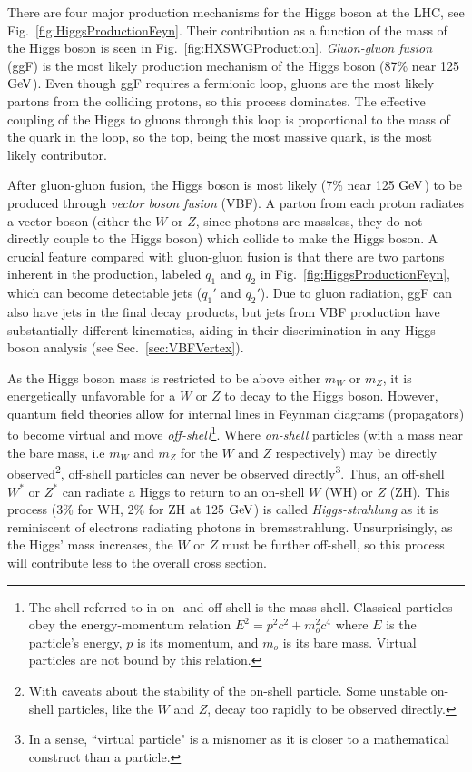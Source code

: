 There are four major production mechanisms for the Higgs boson at the LHC, see Fig.~\ref{fig:HiggsProductionFeyn}. Their contribution as a function of the mass of the Higgs boson is seen in Fig.~\ref{fig:HXSWGProduction}. \textit{Gluon-gluon fusion} (ggF) is the most likely production mechanism of the Higgs boson (87\% near 125 $\rm{GeV}$). Even though ggF requires a fermionic loop, gluons are the most likely partons from the colliding protons, so this process dominates. The effective coupling of the Higgs to gluons through this loop is proportional to the mass of the quark in the loop, so the top, being the most massive quark, is the most likely contributor. 

After gluon-gluon fusion, the Higgs boson is most likely (7\% near 125 $\rm{GeV}$) to be produced through \textit{vector boson fusion} (VBF). A parton from each proton radiates a vector boson (either the $W$ or $Z$, since photons are massless, they do not directly couple to the Higgs boson) which collide to make the Higgs boson. A crucial feature compared with gluon-gluon fusion is that there are two partons inherent in the production, labeled $q_1$ and $q_2$ in Fig.~\ref{fig:HiggsProductionFeyn}, which can become detectable jets ($q_1'$ and $q_2'$). Due to gluon radiation, ggF can also have jets in the final decay products, but jets from VBF production have substantially different kinematics, aiding in their discrimination in any Higgs boson analysis (see Sec.~\ref{sec:VBFVertex}).

As the Higgs boson mass is restricted to be above either $m_W$ or $m_Z$, it is energetically unfavorable for a $W$ or $Z$ to decay to the Higgs boson. However, quantum field theories allow for internal lines in Feynman diagrams (propagators) to become virtual and move \textit{off-shell}\footnote{The shell referred to in on- and off-shell is the mass shell. Classical particles obey the energy-momentum relation $E^2=p^2c^2 + m_o^2c^4$ where $E$ is the particle's energy, $p$ is its momentum, and $m_o$ is its bare mass. Virtual particles are not bound by this relation.}. Where \textit{on-shell} particles (with a mass near the bare mass, i.e $m_W$ and $m_Z$ for the $W$ and $Z$ respectively) may be directly observed\footnote{With caveats about the stability of the on-shell particle. Some unstable on-shell particles, like the $W$ and $Z$, decay too rapidly to be observed directly.}, off-shell particles can never be observed directly\footnote{In a sense, ``virtual particle" is a misnomer as it is closer to a mathematical construct than a particle.}. Thus, an off-shell $W^*$ or $Z^*$ can radiate a Higgs to return to an on-shell $W$ (WH) or $Z$ (ZH). This process (3\% for WH, 2\% for ZH at 125 $\rm{GeV}$) is called \textit{Higgs-strahlung} as it is reminiscent of electrons radiating photons in bremsstrahlung. Unsurprisingly, as the Higgs' mass increases, the $W$ or $Z$ must be further off-shell, so this process will contribute less to the overall cross section.

